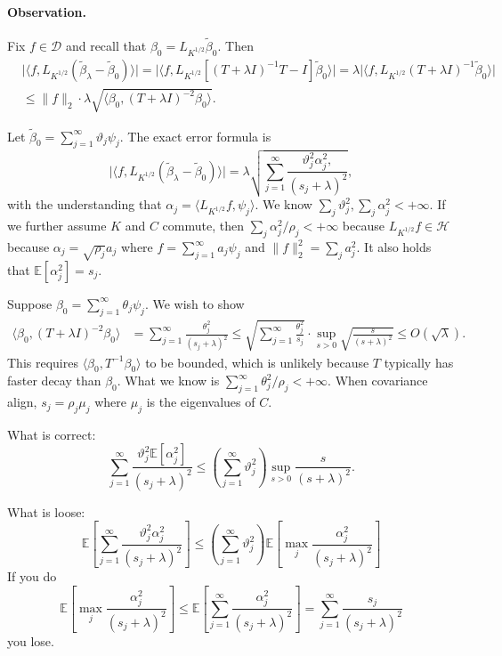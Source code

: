 \documentclass[11pt,a4paper]{article}
\renewcommand{\tilde}{\widetilde}
\theoremstyle{definition}
\theoremstyle{plain}
\theoremstyle{remark}
\newcommand{\mD}{\mathcal D}
\newcommand{\mH}{\mathcal H}
\begin{document}
\paragraph{Observation.} Fix $f\in\mD$ and recall that $\beta_0 = L_{K^{1/2}}\tilde\beta_0$. Then 
\begin{align*}
&\big|\langle f,L_{K^{1/2}}(\tilde\beta_\lambda-\tilde\beta_0)\rangle\big| = \big|\langle f, L_{K^{1/2}}[(T+\lambda I)^{-1}T - I]\tilde\beta_0\rangle\big|
= \lambda \big|\langle f, L_{K^{1/2}}(T+\lambda I)^{-1}\tilde\beta_0\rangle\big|\\
&\leq \|f\|_2\cdot \lambda \sqrt{\langle\beta_0,(T+\lambda I)^{-2}\beta_0\rangle}.
\end{align*}

{\color{red} Let $\tilde\beta_0 =\sum_{j=1}^{\infty} \vartheta_j\psi_j$. The exact error formula is
$$
\big|\langle f,L_{K^{1/2}}(\tilde\beta_\lambda-\tilde\beta_0)\rangle\big| = \lambda \sqrt{\sum_{j=1}^{\infty} \frac{\vartheta_j^2\alpha_j^2,}{(s_j+\lambda)^2}},
$$
with the understanding that $\alpha_j=\langle L_{K^{1/2}}f,\psi_j\rangle$. We know $\sum_j\vartheta_j^2,\sum_j\alpha_j^2<+\infty$. If we further assume $K$ and $C$ commute, then $\sum_j\alpha_j^2/\rho_j<+\infty$
because $L_{K^{1/2}}f\in\mH$ because $\alpha_j=\sqrt{\rho_j}a_j$ where $f=\sum_{j=1}^{\infty} a_j\psi_j$ and $\|f\|_2^2=\sum_j a_j^2$. It also holds that $\mathbb E[\alpha_j^2]=s_j$.
}

{\color{blue}
Suppose $\beta_0=\sum_{j=1}^{\infty}\theta_j\psi_j$.
We wish to show
\begin{align*}
\langle\beta_0, (T+\lambda I)^{-2}\beta_0\rangle &= \sum_{j=1}^{\infty} \frac{\theta_j^2}{(s_j+\lambda)^2} \leq \sqrt{\sum_{j=1}^{\infty}\frac{\theta_j^2}{s_j}}\cdot \sup_{s>0}\sqrt{\frac{s}{(s+\lambda)^2}} \leq O(\sqrt{\lambda}).
\end{align*}
This requires $\langle\beta_0, T^{-1}\beta_0\rangle$ to be bounded, which is unlikely because $T$ typically has faster decay than $\beta_0$.
What we know is $\sum_{j=1}^{\infty}\theta_j^2/\rho_j < +\infty$. When covariance align, $s_j=\rho_j\mu_j$ where $\mu_j$ is the eigenvalues of $C$.
}

{\color{magenta}
What is correct:
$$
\sum_{j=1}^{\infty}\frac{\vartheta_j^2\mathbb E[\alpha_j^2]}{(s_j+\lambda)^2} \leq \left(\sum_{j=1}^{\infty}\vartheta_j^2\right)\sup_{s>0}\frac{s}{(s+\lambda)^2}.
$$

What is loose: 
$$
\mathbb E\left[\sum_{j=1}^{\infty}\frac{\vartheta_j^2\alpha_j^2}{(s_j+\lambda)^2}\right]
\leq \left(\sum_{j=1}^{\infty}\vartheta_j^2\right)\mathbb E\left[\max_j\frac{\alpha_j^2}{(s_j+\lambda)^2}\right]
$$
If you do 
$$
\mathbb E\left[\max_j\frac{\alpha_j^2}{(s_j+\lambda)^2}\right]\leq \mathbb E\left[\sum_{j=1}^{\infty}\frac{\alpha_j^2}{(s_j+\lambda)^2}\right] = \sum_{j=1}^{\infty}\frac{s_j}{(s_j+\lambda)^2}
$$
 you lose.
}
\end{document}
